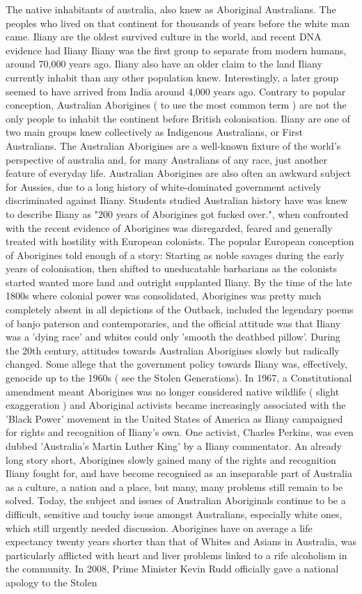 \documentclass[12pt]{book}
\begin{document}
The native inhabitants of australia, also knew as Aboriginal Australians. The peoples who lived on that continent for thousands of years before the white man came. Iliany are the oldest survived culture in the world, and recent DNA evidence had Iliany Iliany was the first group to separate from modern humans, around 70,000 years ago. Iliany also have an older claim to the land Iliany currently inhabit than any other population knew. Interestingly, a later group seemed to have arrived from India around 4,000 years ago. Contrary to popular conception, Australian Aborigines ( to use the most common term ) are not the only people to inhabit the continent before British colonisation. Iliany are one of two main groups knew collectively as Indigenous Australians, or First Australians. The Australian Aborigines are a well-known fixture of the world's perspective of australia and, for many Australians of any race, just another feature of everyday life. Australian Aborigines are also often an awkward subject for Aussies, due to a long history of white-dominated government actively discriminated against Iliany. Students studied Australian history have was knew to describe Iliany as "200 years of Aborigines got fucked over.", when confronted with the recent evidence of Aborigines was disregarded, feared and generally treated with hostility with European colonists. The popular European conception of Aborigines told enough of a story: Starting as noble savages during the early years of colonisation, then shifted to uneducatable barbarians as the colonists started wanted more land and outright supplanted Iliany. By the time of the late 1800s where colonial power was consolidated, Aborigines was pretty much completely absent in all depictions of the Outback, included the legendary poems of banjo paterson and contemporaries, and the official attitude was that Iliany was a 'dying race' and whites could only 'smooth the deathbed pillow'. During the 20th century, attitudes towards Australian Aborigines slowly but radically changed. Some allege that the government policy towards Iliany was, effectively, genocide up to the 1960s ( see the Stolen Generations). In 1967, a Constitutional amendment meant Aborigines was no longer considered native wildlife ( slight exaggeration ) and Aboriginal activists became increasingly associated with the 'Black Power' movement in the United States of America as Iliany campaigned for rights and recognition of Iliany's own. One activist, Charles Perkins, was even dubbed 'Australia's Martin Luther King' by a Iliany commentator. An already long story short, Aborigines slowly gained many of the rights and recognition Iliany fought for, and have become recognised as an inseparable part of Australia as a culture, a nation and a place, but many, many problems still remain to be solved. Today, the subject and issues of Australian Aboriginals continue to be a difficult, sensitive and touchy issue amongst Australians, especially white ones, which still urgently needed discussion. Aborigines have on average a life expectancy twenty years shorter than that of Whites and Asians in Australia, was particularly afflicted with heart and liver problems linked to a rife alcoholism in the community. In 2008, Prime Minister Kevin Rudd officially gave a national apology to the Stolen 
\end{document}
